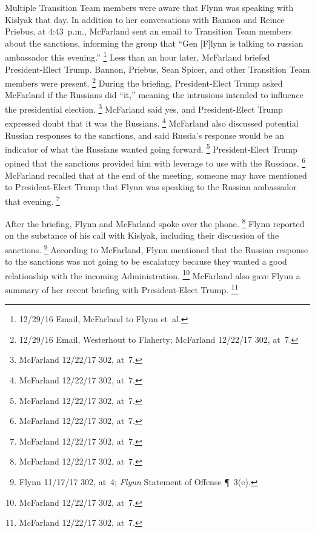 Multiple Transition Team members were aware that Flynn was speaking with Kislyak that day.
In addition to her conversations with Bannon and Reince Priebus, at 4:43~p.m., McFarland sent an email to Transition Team members about the sanctions, informing the group that ``Gen [F]lynn is talking to russian ambassador this evening.''%
\footnote{12/29/16 Email, McFarland to Flynn et~al.}
Less than an hour later, McFarland briefed President-Elect Trump.
Bannon, Priebus, Sean Spicer, and other Transition Team members were present.%
\footnote{12/29/16 Email, Westerhout to Flaherty;
McFarland 12/22/17 302, at~7.}
During the briefing, President-Elect Trump asked McFarland if the Russians did ``it,'' meaning the intrusions intended to influence the presidential election.%
\footnote{McFarland 12/22/17 302, at~7.}
McFarland said yes, and President-Elect Trump expressed doubt that it was the Russians.%
\footnote{McFarland 12/22/17 302, at~7.}
McFarland also discussed potential Russian responses to the sanctions, and said Russia's response would be an indicator of what the Russians wanted going forward.%
\footnote{McFarland 12/22/17 302, at~7.}
President-Elect Trump opined that the sanctions provided him with leverage to use with the Russians.%
\footnote{McFarland 12/22/17 302, at~7.}
McFarland recalled that at the end of the meeting, someone may have mentioned to President-Elect Trump that Flynn was speaking to the Russian ambassador that evening.%
\footnote{McFarland 12/22/17 302, at~7.}

After the briefing, Flynn and McFarland spoke over the phone.%
\footnote{McFarland 12/22/17 302, at~7.}
Flynn reported on the substance of his call with Kislyak, including their discussion of the sanctions.%
\footnote{Flynn 11/17/17 302, at~4;
\textit{Flynn} Statement of Offense \P~3(e).}
According to McFarland, Flynn mentioned that the Russian response to the sanctions was not going to be escalatory because they wanted a good relationship with the incoming Administration.%
\footnote{McFarland 12/22/17 302, at~7.}
McFarland also gave Flynn a summary of her recent briefing with President-Elect Trump.%
\footnote{McFarland 12/22/17 302, at~7.}

